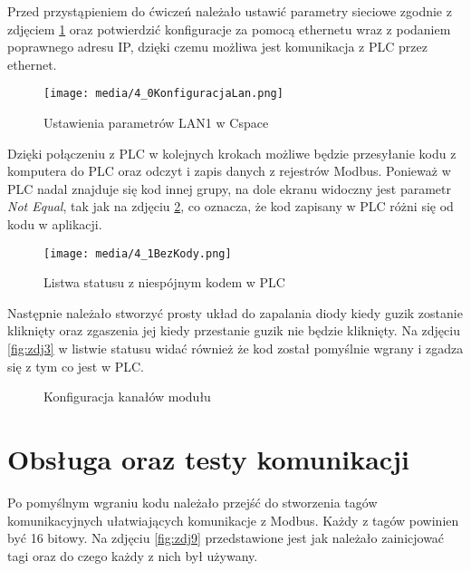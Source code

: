 \documentclass{article}
\begin{document}
Przed przystąpieniem do ćwiczeń należało ustawić parametry sieciowe zgodnie z zdjęciem \ref{fig:zdj1} oraz potwierdzić konfiguracje za pomocą ethernetu wraz z podaniem poprawnego adresu IP, dzięki czemu możliwa jest komunikacja z PLC przez ethernet.
\begin{figure}[H]
    \centering
    \texttt{[image: media/4\_0KonfiguracjaLan.png]}
    \caption{Ustawienia parametrów LAN1 w Cspace}
    \label{fig:zdj1}
\end{figure}

Dzięki połączeniu z PLC w kolejnych krokach możliwe będzie przesyłanie kodu z komputera do PLC oraz odczyt i zapis danych z rejestrów Modbus. Ponieważ w PLC nadal znajduje się kod innej grupy, na dole ekranu widoczny jest parametr \textit{Not Equal}, tak jak na zdjęciu \ref{fig:zdj2}, co oznacza, że kod zapisany w PLC różni się od kodu w aplikacji.
\begin{figure}[H]
    \centering
    \texttt{[image: media/4\_1BezKody.png]}
    \caption{Listwa statusu z niespójnym kodem w PLC}
    \label{fig:zdj2}
\end{figure}

\newpage
Następnie należało stworzyć prosty układ do zapalania diody kiedy guzik zostanie kliknięty oraz zgaszenia jej kiedy przestanie guzik nie będzie kliknięty. Na zdjęciu \ref{fig:zdj3} w listwie statusu widać również że kod został pomyślnie wgrany i zgadza się z tym co jest w PLC.

\begin{figure}[!ht]
    \centering
   
        \hfill
    \caption{Konfiguracja kanałów modułu}
    \label{fig:main1}
\end{figure}


\newpage
\section{Obsługa oraz testy komunikacji}
Po pomyślnym wgraniu kodu należało przejść do stworzenia tagów komunikacyjnych ułatwiających komunikacje z Modbus. Każdy z tagów powinien być 16 bitowy. Na zdjęciu \ref{fig:zdj9} przedstawione jest jak należało zainicjować tagi oraz do czego każdy z nich był używany.
\end{document}
